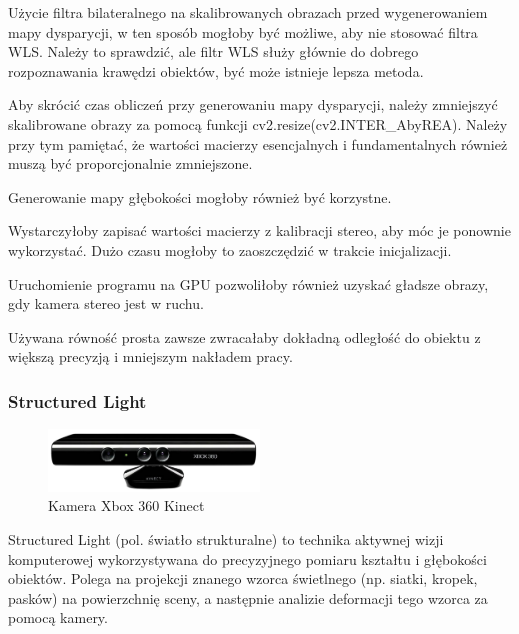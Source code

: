 \documentclass[magisterska]{pracadypl}
\begin{document}
Użycie filtra bilateralnego na skalibrowanych obrazach przed wygenerowaniem mapy dysparycji, w ten sposób mogłoby być możliwe, aby nie stosować filtra WLS. Należy to sprawdzić, ale filtr WLS służy głównie do dobrego rozpoznawania krawędzi obiektów, być może istnieje lepsza metoda.

Aby skrócić czas obliczeń przy generowaniu mapy dysparycji, należy zmniejszyć skalibrowane obrazy za pomocą funkcji cv2.resize(cv2.INTER\_AbyREA). Należy przy tym pamiętać, że wartości macierzy esencjalnych i fundamentalnych również muszą być proporcjonalnie zmniejszone.

Generowanie mapy głębokości mogłoby również być korzystne.

Wystarczyłoby zapisać wartości macierzy z kalibracji stereo, aby móc je ponownie wykorzystać. Dużo czasu mogłoby to zaoszczędzić w trakcie inicjalizacji.

Uruchomienie programu na GPU pozwoliłoby również uzyskać gładsze obrazy, gdy kamera stereo jest w ruchu.

Używana równość prosta zawsze zwracałaby dokładną odległość do obiektu z większą precyzją i mniejszym nakładem pracy.

\subsubsection*{Structured Light}

\begin{figure}[H]  %
    \centering  %
    \includegraphics[width=0.5\textwidth]{images/POINTCLOUD.png}  %
    \captionsetup{font=footnotesize}
    \caption[Kamera Xbox 360 Kinect. https://cell-kom.com/inne/21454-kamera-internetowa-full-hd-b16-1080p-5900217390350.html]{Kamera Xbox 360 Kinect}
    \label{fig:kinect}  %
\end{figure}

Structured Light (pol. światło strukturalne) to technika aktywnej wizji komputerowej wykorzystywana do precyzyjnego pomiaru kształtu i głębokości obiektów. Polega na projekcji znanego wzorca świetlnego (np. siatki, kropek, pasków) na powierzchnię sceny, a następnie analizie deformacji tego wzorca za pomocą kamery.
\end{document}
